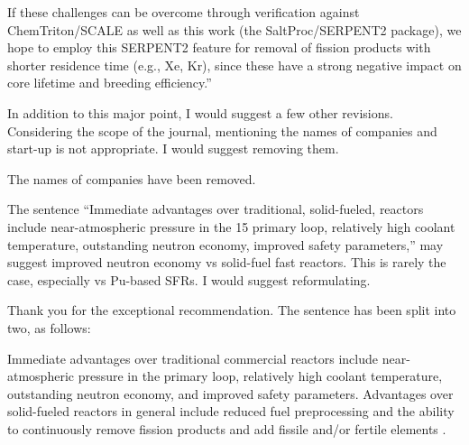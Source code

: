 \documentclass[answers,11pt]{exam}
\begin{document}
\begin{questions}
\begin{solution}
                If these challenges can be overcome through verification 
                against ChemTriton/SCALE as well as this work (the 
                SaltProc/SERPENT2 package), we hope to employ this SERPENT2 
                feature for removal of fission products with shorter residence 
                time (e.g., Xe, Kr), since these have a strong negative impact 
                on core lifetime and breeding efficiency.''

        \end{solution}


        \question In addition to this major point, I would suggest a few other 
        revisions. Considering the scope of the journal, mentioning the names of 
        companies and start-up is not appropriate. I would suggest removing 
        them.
        \begin{solution}
                The names of companies have been removed.
        \end{solution}

        
        \question The sentence ``Immediate advantages over traditional, solid-fueled, 
        reactors include near-atmospheric pressure in the 15 primary loop, 
        relatively high coolant temperature, outstanding neutron economy, 
        improved safety parameters,'' may suggest improved neutron economy vs 
        solid-fuel fast reactors. This is rarely the case, especially vs 
        Pu-based SFRs. I would suggest reformulating.
        \begin{solution}
                Thank you for the exceptional recommendation. The sentence has 
                been split into two, as follows:

                Immediate advantages over traditional commercial reactors 
                include near-atmospheric pressure in the primary loop, 
                relatively high coolant temperature, outstanding neutron 
                economy, and improved safety parameters. Advantages over 
                solid-fueled reactors in general include reduced fuel 
                preprocessing and the ability to continuously remove fission 
                products and add fissile and/or fertile elements 
                \cite{leblanc_molten_2010}.

        \end{solution}


\end{questions}
\end{document}
